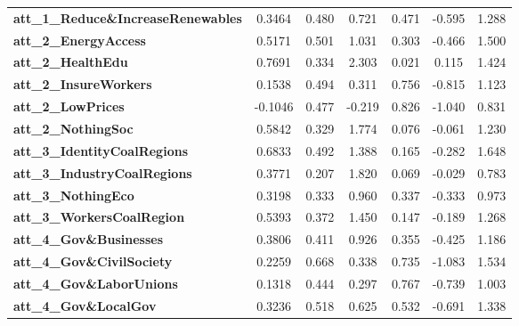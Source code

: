 \begin{center}
\begin{tabular}{lcccccc}
\textbf{att\_1\_Reduce\&IncreaseRenewables} &       0.3464  &        0.480     &     0.721  &         0.471        &       -0.595    &        1.288     \\
\textbf{att\_2\_EnergyAccess}               &       0.5171  &        0.501     &     1.031  &         0.303        &       -0.466    &        1.500     \\
\textbf{att\_2\_HealthEdu}                  &       0.7691  &        0.334     &     2.303  &         0.021        &        0.115    &        1.424     \\
\textbf{att\_2\_InsureWorkers}              &       0.1538  &        0.494     &     0.311  &         0.756        &       -0.815    &        1.123     \\
\textbf{att\_2\_LowPrices}                  &      -0.1046  &        0.477     &    -0.219  &         0.826        &       -1.040    &        0.831     \\
\textbf{att\_2\_NothingSoc}                 &       0.5842  &        0.329     &     1.774  &         0.076        &       -0.061    &        1.230     \\
\textbf{att\_3\_IdentityCoalRegions}        &       0.6833  &        0.492     &     1.388  &         0.165        &       -0.282    &        1.648     \\
\textbf{att\_3\_IndustryCoalRegions}        &       0.3771  &        0.207     &     1.820  &         0.069        &       -0.029    &        0.783     \\
\textbf{att\_3\_NothingEco}                 &       0.3198  &        0.333     &     0.960  &         0.337        &       -0.333    &        0.973     \\
\textbf{att\_3\_WorkersCoalRegion}          &       0.5393  &        0.372     &     1.450  &         0.147        &       -0.189    &        1.268     \\
\textbf{att\_4\_Gov\&Businesses}            &       0.3806  &        0.411     &     0.926  &         0.355        &       -0.425    &        1.186     \\
\textbf{att\_4\_Gov\&CivilSociety}          &       0.2259  &        0.668     &     0.338  &         0.735        &       -1.083    &        1.534     \\
\textbf{att\_4\_Gov\&LaborUnions}           &       0.1318  &        0.444     &     0.297  &         0.767        &       -0.739    &        1.003     \\
\textbf{att\_4\_Gov\&LocalGov}              &       0.3236  &        0.518     &     0.625  &         0.532        &       -0.691    &        1.338     \\

\end{tabular}
\end{center}
